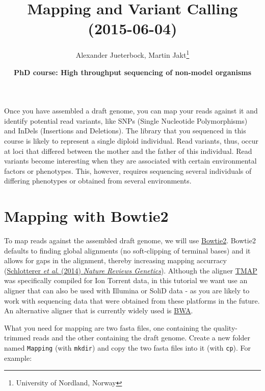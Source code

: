 \documentclass[11pt]{article}
\author{Alexander Jueterbock, Martin Jakt\thanks{University of Nordland, Norway}}
\date{\textbf{PhD course: High throughput sequencing of non-model organisms}}
\title{\textbf{Mapping and Variant Calling} (2015-06-04)}
\begin{document}
\maketitle
\tableofcontents







Once you have assembled a draft genome, you can map your reads against it
and identify potential read variants, like SNPs (Single Nucleotide
Polymorphisms) and InDels (Insertions and Deletions). The library that
you sequenced in this course is likely to represent a single diploid
individual. Read variants, thus, occur at loci that differed between
the mother and the father of this individual. Read variants become
interesting when they are associated with certain environmental
factors or phenotypes. This, however, requires sequencing several
individuals of differing phenotypes or obtained from several  
environments.

\section{Mapping with Bowtie2}
\label{sec-1}
To map reads against the assembled draft genome, we will use \href{http://bowtie-bio.sourceforge.net/bowtie2/index.shtml}{Bowtie2}.
Bowtie2 defaults to finding global alignments (no soft-clipping of
terminal bases) and it allows for gaps in the alignment, thereby
increasing mapping accurracy (\href{http://www.nature.com/nrg/journal/v15/n11/full/nrg3803.html}{Schlotterer \emph{et al}. (2014) \emph{Nature
Reviews Genetics}}). Although the aligner \href{https://www.google.no/url?sa=t&rct=j&q=&esrc=s&source=web&cd=5&ved=0CD4QFjAE&url=https\%3A\%2F\%2Fgithub.com\%2Fiontorrent\%2FTMAP&ei=1u07VZCXFYGqywPBz4DoDg&usg=AFQjCNE3vZXuQ1ygljhBcrozKj_nBU84TQ&sig2=u5_YVYBE904ay-9oLUuMOQ&bvm=bv.91665533,d.bGQ}{TMAP} was specifically
compiled for Ion Torrent data, in this tutorial we want use an aligner
that can also be used with Illumina or SoliD data - as you are likely
to work with sequencing data that were obtained from these
platforms in the future. An alternative aligner that is currently widely used is
\href{http://bio-bwa.sourceforge.net/}{BWA}.

What you need for mapping are two fasta files, one containing the
quality-trimmed reads and the other containing the draft genome.
Create a new folder named \texttt{Mapping} (with \texttt{mkdir}) and copy the two
fasta files into it (with \texttt{cp}). For example:
\end{document}

